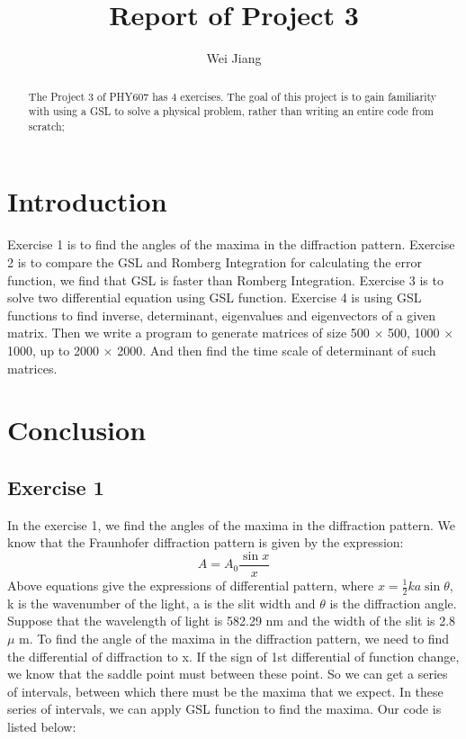 \documentclass{article}
\begin{document}
\title{Report of Project 3}
\author{Wei Jiang}

\maketitle

\begin{abstract}
The Project 3 of PHY607 has 4 exercises.
The goal of this project is to gain familiarity with using a GSL to solve a physical problem, rather than writing an entire code from scratch; 
\end{abstract}



\section{Introduction}

Exercise 1 is to find the angles of the maxima in the diffraction pattern. Exercise 2 is to compare the GSL and Romberg Integration for calculating the error function, we find that GSL is faster than Romberg Integration. Exercise 3 is to solve two differential equation using GSL function. Exercise 4 is using GSL functions to find inverse, determinant, eigenvalues and eigenvectors of a given matrix. Then we write a program to generate matrices of size 500 $\times$ 500, 1000 $\times$ 1000, up to 2000 $\times$ 2000. And then find the time scale of determinant of such matrices.


\section{Conclusion}
\subsection{Exercise 1}
In the exercise 1, we find the angles of the maxima in the diffraction pattern. We know that the Fraunhofer diffraction pattern is given by the expression:
\begin{equation}
A = A_0\frac{\sin{x}}{x}
\end{equation}
Above equations give the expressions of differential pattern, where $x = \frac{1}{2}ka\sin{\theta}$, k is the wavenumber of the light, a is the slit width and $\theta$ is the diffraction angle. Suppose that the wavelength of light is 582.29 nm and the width of the slit is 2.8 $\mu$ m. To find the angle of the maxima in the diffraction pattern, we need to find the differential of diffraction to x. If the sign of 1st differential of function change, we know that the saddle point must between these point. So we can get a series of intervals, between which there must be the maxima that we expect. In these series of intervals, we can apply GSL function to find the maxima. Our code is listed below:
\end{document}
